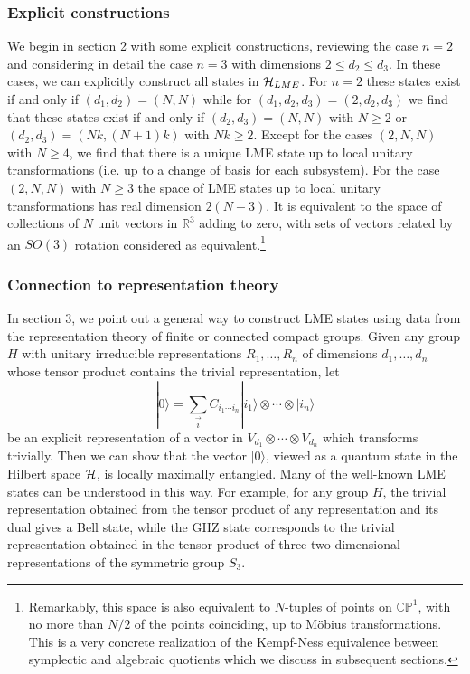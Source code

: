 \documentclass[12pt]{article}
\theoremstyle{definition}
\newcommand{\be}{\begin{equation}}
\newcommand{\ee}{\end{equation}}
\begin{document}
\subsubsection*{Explicit constructions}

We begin in section 2 with some explicit constructions, reviewing the
case $n=2$ and considering in detail the case $n=3$ with dimensions $2
\le d_2 \le d_3$. In these cases, we can explicitly construct all
states in ${\cal H}_{LME}$. For $n=2$ these states exist if and only
if $(d_1,d_2) = (N,N)$ while for $(d_1, d_2, d_3) = (2,d_2,d_3)$ we
find that these states exist if and only if $(d_2,d_3) = (N,N)$ with
$N \ge 2$ or $(d_2,d_3) = (Nk,(N+1)k)$ with $N k \ge 2$. Except for the
cases $(2,N,N)$ with $N \ge 4$, we find that there is a unique LME
state up to local unitary transformations (i.e. up to a change of
basis for each subsystem). For the case $(2,N,N)$ with $N \ge 3$ the
space of LME states up to local unitary transformations has real
dimension $2(N-3)$. It is equivalent to the space of collections of
$N$ unit vectors in $\mathbb{R}^3$ adding to zero, with sets of
vectors related by an $SO(3)$ rotation considered as
equivalent.\footnote{Remarkably, this space is also equivalent to $N$-tuples of
points on $\mathbb{CP}^{1}$, with no more than $N/2$ of the points
coinciding, up to M\"obius transformations. This is a very concrete
realization of the Kempf-Ness equivalence between symplectic
and algebraic quotients which we discuss in subsequent sections.}

\subsubsection*{Connection to representation theory}

In section 3, we point out a general way to construct LME states using
data from the representation theory of finite or connected compact
groups. Given any group $H$ with unitary irreducible representations
$R_1,\dots ,R_n$ of dimensions $d_1, \dots, d_n$ whose tensor product
contains the trivial representation, let \be |0 \rangle =
\sum_{\vec{i}} C_{i_1 \cdots i_n} |i_1 \rangle  \otimes \cdots  \otimes
|i_n \rangle \ee be an explicit representation of a vector in $V_{d_1}
 \otimes \cdots  \otimes V_{d_n}$ which transforms trivially. Then we
can show that the vector $|0 \rangle$, viewed as a quantum state in
the Hilbert space ${\cal H}$, is locally maximally entangled. Many of
the well-known LME states can be understood in this way. For example,
for any group $H$, the trivial representation obtained from the tensor
product of any representation and its dual gives a Bell state, while
the GHZ state corresponds to the trivial representation obtained in
the tensor product of three two-dimensional representations of the
symmetric group $S_3$.
\end{document}
